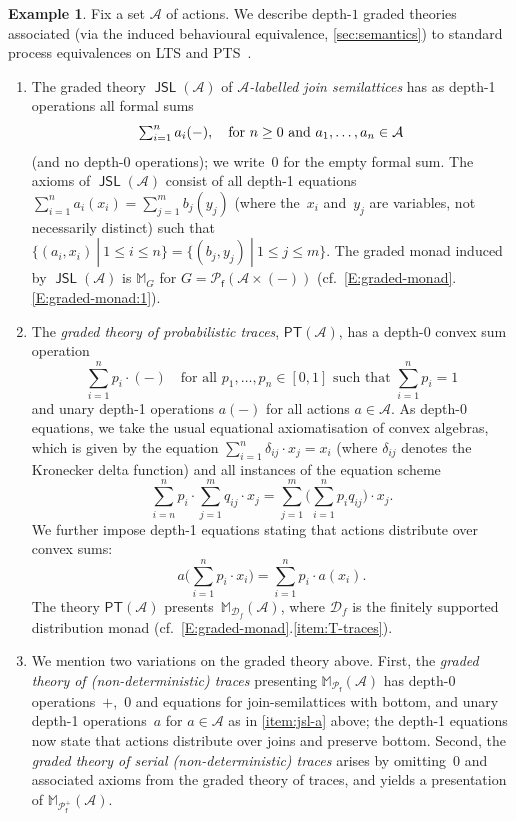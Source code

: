 \documentclass[sigconf,
			final%
			nonacm
                        ]{acmart}
\numberwithin{equation}{section}
\numberwithin{equation}{section}
\theoremstyle{plain}
\theoremstyle{definition}
\newtheorem{expl}[thm]{Example}
\newcommand{\M}{\mathbb{M}}                   %
\newcommand{\A}{\mathcal{A}}            %
\DeclareMathOperator{\JSL}{\mathsf{JSL}}
\newcommand{\PT}{\mathsf{PT}}
\newcommand{\pow}{\mathscr P}              %
\newcommand{\powf}{\pow_{\mathsf f}}
\newcommand{\CalD}{\mathcal{D}}            %
\begin{document}
\begin{expl}\label{E:graded-theory}
  Fix a set $\A$ of actions. We describe \mbox{depth-$1$} graded theories
  associated (via the induced behavioural equivalence,
  \cref{sec:semantics}) to standard process equivalences on LTS and
  PTS~\cite{DMS19}.
\begin{enumerate}
\item\label{item:jsl-a} The graded theory $\JSL(\A)$ of
  \emph{$\A$-labelled join semilattices} has as depth-1 operations all
  formal sums
  \[
    \textstyle\sum_{i=1}^na_i(-),
    \quad
    \text{for \mbox{$n\ge 0$} and $a_1,\dots,a_n\in\A$}
  \]
  (and no depth-$0$ operations); we write~$0$ for
  the empty formal sum. The axioms of $\JSL(\A)$ consist of all
  depth-1 equations $\sum_{i=1}^na_i(x_i) = \sum_{j=1}^m b_j(y_j)$
  (where the~$x_i$ and~$y_j$ are variables, not necessarily distinct)
  such that
  $\{(a_i, x_i)~|~1\le i\leq n\}=\{(b_j, y_j)~|~1\le j\leq m\}$.  The
  graded monad induced by $\JSL(\A)$ is $\M_G$ for
  $G=\powf(\A\times(-))$
  (cf.~\cref{E:graded-monad}.\ref{E:graded-monad:1}).

\item\label{item:pt-a} The \emph{graded theory of probabilistic
    traces}, $\PT(\A)$, has a depth-0 convex sum operation
  \[
    \textstyle\sum^n_{i = 1} p_i\cdot(-)
    \quad
    \text{for all $p_1, \ldots, p_n \in [0,1]$ such that
      $\sum^n_{i=1} p_i = 1$}
  \]
  and unary depth-1 operations $a(-)$ for all actions $a\in\A$. As
  depth-0 equations, we take the usual equational axiomatisation of
  convex algebras, which is given by the equation
  $\sum^n_{i = 1}\delta_{ij}\cdot x_j = x_i$ (where $\delta_{ij}$
  denotes the Kronecker delta function) and all instances of the
  equation scheme
\[
\sum^n_{i = n} p_i\cdot \sum^m_{j=1} q_{ij}\cdot x_j =
\sum_{j=1}^m \Big(\sum^{n}_{i=1}p_iq_{ij}\Big)\cdot x_j.
\]
We further impose depth-1 equations
stating that actions distribute over
convex sums:
\[
a\Big(\sum_{i=1}^np_i\cdot x_i\Big) = \sum_{i=1}^n p_i\cdot a(x_i).
\]
The theory $\PT(\A)$ presents~$\M_{\CalD_f}(\A)$,
where $\CalD_f$ is the finitely supported distribution monad
(cf.~\cref{E:graded-monad}.\ref{item:T-traces}).

\item\label{item:traces-a} We mention two variations on the graded
  theory above. First, the \emph{graded theory of (non-deterministic)
    traces} presenting $\M_{\powf}(\A)$ has depth-0
  operations~$+$,~$0$ and equations for join-semilattices with bottom,
  and unary depth-1 operations~$a$ for $a\in\A$ as in
  \ref{item:jsl-a} above; the depth-1 equations now state that
  actions distribute over joins and preserve bottom. Second, the
  \emph{graded theory of serial (non-deterministic) traces} arises by
  omitting~$0$ and associated axioms from the graded theory of traces,
  and yields a presentation of $\M_{\powf^+}(\A)$.


\end{enumerate}
\end{expl}
\end{document}
